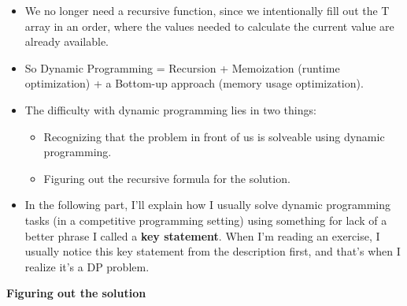 \begin{itemize}
\item We no longer need a recursive function, since we intentionally fill out the T array in an order, where the values needed to calculate the current value are already available.
\item So Dynamic Programming = Recursion + Memoization (runtime optimization) + a Bottom-up approach (memory usage optimization).
\item The difficulty with dynamic programming lies in two things:
\begin{itemize}
    \item Recognizing that the problem in front of us is solveable using dynamic programming.
    \item Figuring out the recursive formula for the solution.
\end{itemize}
\item In the following part, I'll explain how I usually solve dynamic programming tasks (in a competitive programming setting) using something for lack of a better phrase I called a \textbf{key statement}. When I'm reading an exercise, I usually notice this key statement from the description first, and that's when I realize it's a DP problem.
\end{itemize}

\textbf{Figuring out the solution}

